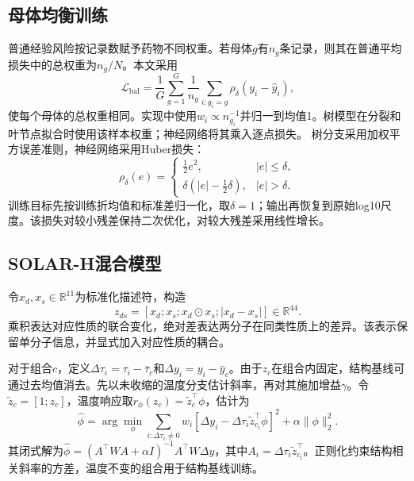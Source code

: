 \subsection{母体均衡训练}
普通经验风险按记录数赋予药物不同权重。若母体$g$有$n_g$条记录，则其在普通平均损失中的总权重为$n_g/N$。本文采用
\begin{equation}\label{eq:balanced}
\mathcal L_{\mathrm{bal}}=\frac1G\sum_{g=1}^{G}\frac1{n_g}
\sum_{i:g_i=g}\rho_\delta(y_i-\hat y_i),
\end{equation}
使每个母体的总权重相同。实现中使用$w_i\propto n_{g_i}^{-1}$并归一到均值1。树模型在分裂和叶节点拟合时使用该样本权重；神经网络将其乘入逐点损失。
树分支采用加权平方误差准则，神经网络采用Huber损失：
\begin{equation}
\rho_\delta(e)=\begin{cases}\frac12e^2,&|e|\leq\delta,\\
\delta(|e|-\frac12\delta),&|e|>\delta.
\end{cases}
\end{equation}
训练目标先按训练折均值和标准差归一化，取$\delta=1$；输出再恢复到原始log10尺度。该损失对较小残差保持二次优化，对较大残差采用线性增长。

\subsection{SOLAR-H混合模型}
令$x_d,x_s\in\mathbb R^{11}$为标准化描述符，构造
\begin{equation}\label{eq:explicit}
z_{ds}=[x_d;x_s;x_d\odot x_s;|x_d-x_s|]\in\mathbb R^{44}.
\end{equation}
乘积表达对应性质的联合变化，绝对差表达两分子在同类性质上的差异。该表示保留单分子信息，并显式加入对应性质的耦合。

对于组合$c$，定义$\Delta\tau_i=\tau_i-\bar\tau_c$和$\Delta y_i=y_i-\bar y_c$。由于$z_c$在组合内固定，结构基线可通过去均值消去。先以未收缩的温度分支估计斜率，再对其施加增益$\gamma$。令$\tilde z_c=[1;z_c]$，温度响应取$r_\phi(z_c)=\tilde z_c^\top\phi$，估计为
\begin{equation}\label{eq:slope}
\hat\phi=\arg\min_\phi\sum_{i:\Delta\tau_i\ne0}w_i
\left[\Delta y_i-\Delta\tau_i\tilde z_{c_i}^{\top}\phi\right]^2
+\alpha\|\phi\|_2^2.
\end{equation}
其闭式解为$\hat\phi=(A^\top WA+\alpha I)^{-1}A^\top W\Delta y$，其中$A_i=\Delta\tau_i\tilde z_{c_i}^{\top}$。正则化约束结构相关斜率的方差，温度不变的组合用于结构基线训练。

